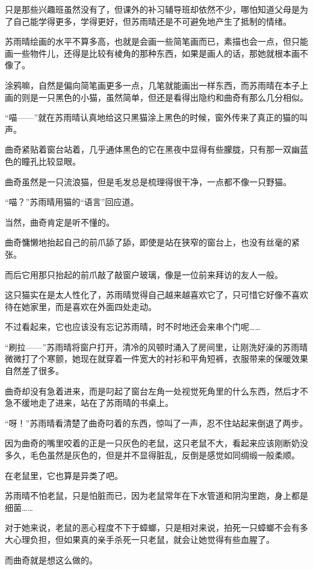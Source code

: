 只是那些兴趣班虽然没有了，但课外的补习辅导班却依然不少，哪怕知道父母是为了自己能学得更多，学得更好，但苏雨晴还是不可避免地产生了抵制的情绪。

苏雨晴绘画的水平不算多高，也就是会画一些简笔画而已，素描也会一点，但只能画一些物件儿，还得是比较有棱角的那种东西，如果是画人的话，那她就根本画不像了。

涂鸦嘛，自然是偏向简笔画更多一点，几笔就能画出一样东西，而苏雨晴在本子上画的则是一只黑色的小猫，虽然简单，但还是看得出隐约和曲奇有那么几分相似。

“喵——”就在苏雨晴认真地给这只黑猫涂上黑色的时候，窗外传来了真正的猫的叫声。

曲奇紧贴着窗台站着，几乎通体黑色的它在黑夜中显得有些朦胧，只有那一双幽蓝色的瞳孔比较显眼。

曲奇虽然是一只流浪猫，但是毛发总是梳理得很干净，一点都不像一只野猫。

“喵？”苏雨晴用猫的“语言”回应道。

当然，曲奇肯定是听不懂的。

曲奇慵懒地抬起自己的前爪舔了舔，即使是站在狭窄的窗台上，也没有丝毫的紧张。

而后它用那只抬起的前爪敲了敲窗户玻璃，像是一位前来拜访的友人一般。

这只猫实在是太人性化了，苏雨晴觉得自己越来越喜欢它了，只可惜它好像不喜欢待在她家里，而是喜欢在外面四处走动。

不过看起来，它也应该没有忘记苏雨晴，时不时地还会来串个门呢……

“刷拉——”苏雨晴将窗户打开，清冷的风顿时涌入了房间里，让刚洗好澡的苏雨晴微微打了个寒颤，她现在就穿着一件宽大的衬衫和平角短裤，衣服带来的保暖效果自然差了很多。

曲奇却没有急着进来，而是叼起了窗台左角一处视觉死角里的什么东西，然后才不急不缓地走了进来，站在了苏雨晴的书桌上。

“呀！”苏雨晴看清楚了曲奇叼着的东西，惊叫了一声，忍不住站起来倒退了两步。

因为曲奇的嘴里咬着的正是一只灰色的老鼠，这只老鼠不大，看起来应该刚断奶没多久，毛色虽然是灰色的，但是并不显得脏乱，反倒是感觉如同绸缎一般柔顺。

在老鼠里，它也算是异类了吧。

苏雨晴不怕老鼠，只是怕脏而已，因为老鼠常年在下水管道和阴沟里跑，身上都是细菌……

对于她来说，老鼠的恶心程度不下于蟑螂，只是相对来说，拍死一只蟑螂不会有多大心理负担，但如果真的亲手杀死一只老鼠，就会让她觉得有些血腥了。

而曲奇就是想这么做的。

